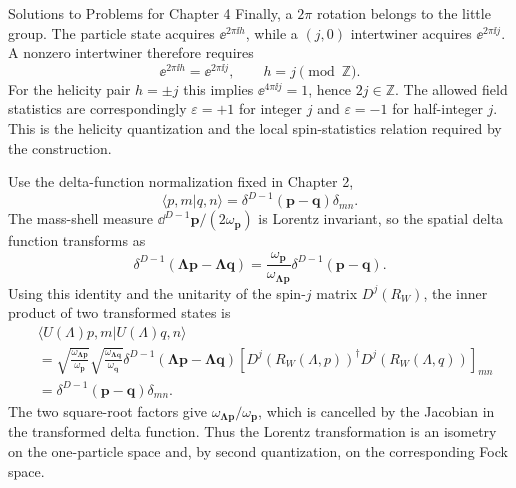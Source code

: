 \begin{bankssolutions}{Solutions to Problems for Chapter 4}
Finally, a $2\pi$ rotation belongs to the little group.  The particle state
acquires $\ee^{2\pi\ii h}$, while a $(j,0)$ intertwiner acquires
$\ee^{2\pi\ii j}$.  A nonzero intertwiner therefore requires
\begin{equation*}
 \ee^{2\pi\ii h}=\ee^{2\pi\ii j},
 \qquad h=j\pmod{\mathbb Z}.
\end{equation*}
For the helicity pair $h=\pm j$ this implies
$\ee^{4\pi\ii j}=1$, hence $2j\in\mathbb Z$.  The allowed field statistics
are correspondingly $\varepsilon=+1$ for integer $j$ and $\varepsilon=-1$
for half-integer $j$.  This is the helicity quantization and the local
spin-statistics relation required by the construction.

Use the delta-function normalization fixed in Chapter 2,
\begin{equation*}
 \langle p,m|q,n\rangle
 =\delta^{D-1}(\mathbf p-\mathbf q)\delta_{mn}.
\end{equation*}
The mass-shell measure $\dd^{D-1}\mathbf p/(2\omega_{\mathbf p})$ is Lorentz invariant, so the
spatial delta function transforms as
\begin{equation*}
 \delta^{D-1}(\boldsymbol{\Lambda p}-\boldsymbol{\Lambda q})
 =\frac{\omega_{\mathbf p}}{\omega_{\boldsymbol{\Lambda p}}}
 \delta^{D-1}(\mathbf p-\mathbf q).
\end{equation*}
Using this identity and the unitarity of the spin-$j$ matrix $D^j(R_W)$,
the inner product of two transformed states is
\begin{align*}
 &\langle U(\Lambda)p,m|U(\Lambda)q,n\rangle\\
 &=\sqrt{\frac{\omega_{\boldsymbol{\Lambda p}}}{\omega_{\mathbf p}}}
 \sqrt{\frac{\omega_{\boldsymbol{\Lambda q}}}{\omega_{\mathbf q}}}
 \delta^{D-1}(\boldsymbol{\Lambda p}-\boldsymbol{\Lambda q})
 \left[D^j(R_W(\Lambda,p))^\dagger D^j(R_W(\Lambda,q))\right]_{mn}\\
 &=\delta^{D-1}(\mathbf p-\mathbf q)\delta_{mn}.
\end{align*}
The two square-root factors give $\omega_{\boldsymbol{\Lambda p}}/\omega_{\mathbf p}$,
which is cancelled by the Jacobian in the transformed delta function.  Thus
the Lorentz transformation is an isometry on the one-particle space and, by
second quantization, on the corresponding Fock space.


\end{bankssolutions}
